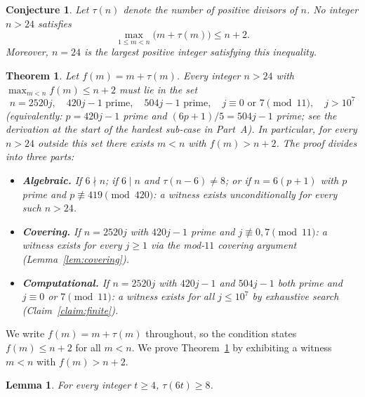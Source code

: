 \documentclass[11pt]{article}
\newtheorem{theorem}{Theorem}
\newtheorem{conjecture}{Conjecture}
\newtheorem{lemma}{Lemma}
\begin{document}
\begin{conjecture}\label{conj:main}
Let $\tau(n)$ denote the number of positive divisors of $n$.  No integer $n > 24$
satisfies
\[
  \max_{1 \le m < n}\bigl(m + \tau(m)\bigr) \le n + 2.
\]
Moreover, $n = 24$ is the \emph{largest} positive integer satisfying this inequality.
\end{conjecture}

\begin{theorem}\label{thm:partial}
Let $f(m) = m + \tau(m)$.  Every integer $n > 24$ with $\max_{m<n} f(m) \le n+2$
must lie in the set
\[
  n = 2520j,\quad 420j{-}1 \text{ prime},\quad 504j{-}1 \text{ prime},\quad
  j\equiv 0 \text{ or } 7\pmod{11},\quad j > 10^7
\]
(equivalently: $p = 420j{-}1$ prime and $(6p+1)/5 = 504j{-}1$ prime;
see the derivation at the start of the hardest sub-case in Part~A).
In particular, for every $n > 24$ outside this set there exists $m < n$ with $f(m) > n+2$.  The proof divides into three parts:
\begin{itemize}
  \item[\textup{(A)}] \textbf{Algebraic.}  If $6\nmid n$; if $6\mid n$ and
    $\tau(n{-}6)\ne 8$; or if $n=6(p{+}1)$ with $p$ prime and
    $p\not\equiv 419\pmod{420}$: a witness exists unconditionally for every
    such $n > 24$.
  \item[\textup{(B)}] \textbf{Covering.}  If $n=2520j$ with $420j{-}1$ prime
    and $j\not\equiv 0,7\pmod{11}$: a witness exists for every $j\ge 1$
    via the mod-$11$ covering argument (Lemma~\ref{lem:covering}).
  \item[\textup{(C)}] \textbf{Computational.}  If $n=2520j$ with $420j{-}1$
    and $504j{-}1$ both prime and $j\equiv 0$ or $7\pmod{11}$: a witness
    exists for all $j\le 10^7$ by exhaustive search
    (Claim~\ref{claim:finite}).
\end{itemize}
\end{theorem}

We write $f(m) = m + \tau(m)$ throughout, so the condition states
$f(m) \le n+2$ for all $m < n$.  We prove Theorem~\ref{thm:partial} by
exhibiting a witness $m < n$ with $f(m) > n + 2$.

\begin{lemma}\label{lem:tau6t}
For every integer $t \ge 4$, $\tau(6t) \ge 8$.
\end{lemma}
\end{document}
